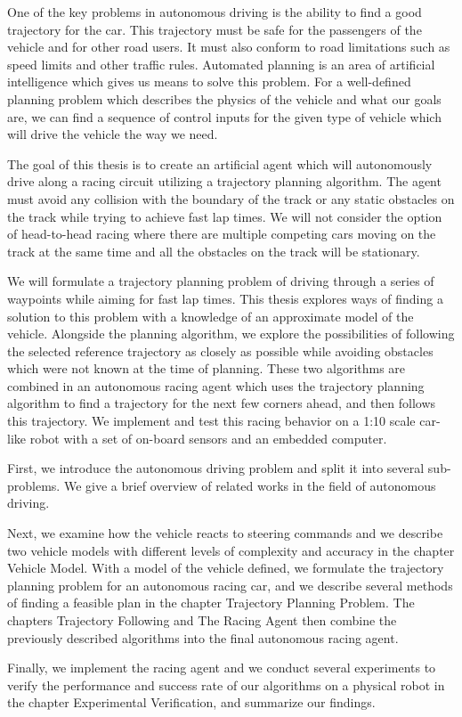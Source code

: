 One of the key problems in autonomous driving is the ability to find a good trajectory for the car. This trajectory must be safe for the passengers of the vehicle and for other road users. It must also conform to road limitations such as speed limits and other traffic rules. Automated planning is an area of artificial intelligence which gives us means to solve this problem. For a well-defined planning problem which describes the physics of the vehicle and what our goals are, we can find a sequence of control inputs for the given type of vehicle which will drive the vehicle the way we need.

The goal of this thesis is to create an artificial agent which will autonomously drive along a racing circuit utilizing a trajectory planning algorithm. The agent must avoid any collision with the boundary of the track or any static obstacles on the track while trying to achieve fast lap times. We will not consider the option of head-to-head racing where there are multiple competing cars moving on the track at the same time and all the obstacles on the track will be stationary.

We will formulate a trajectory planning problem of driving through a series of waypoints while aiming for fast lap times. This thesis explores ways of finding a solution to this problem with a knowledge of an approximate model of the vehicle. Alongside the planning algorithm, we explore the possibilities of following the selected reference trajectory as closely as possible while avoiding obstacles which were not known at the time of planning. These two algorithms are combined in an autonomous racing agent which uses the trajectory planning algorithm to find a trajectory for the next few corners ahead, and then follows this trajectory. We implement and test this racing behavior on a 1:10 scale car-like robot with a set of on-board sensors and an embedded computer.

First, we introduce the autonomous driving problem and split it into several sub-problems. We give a brief overview of related works in the field of autonomous driving.

Next, we examine how the vehicle reacts to steering commands and we describe two vehicle models with different levels of complexity and accuracy in the chapter Vehicle Model. With a model of the vehicle defined, we formulate the trajectory planning problem for an autonomous racing car, and we describe several methods of finding a feasible plan in the chapter Trajectory Planning Problem. The chapters Trajectory Following and The Racing Agent then combine the previously described algorithms into the final autonomous racing agent.

Finally, we implement the racing agent and we conduct several experiments to verify the performance and success rate of our algorithms on a physical robot in the chapter Experimental Verification, and summarize our findings.
